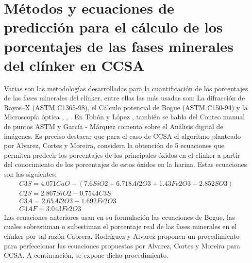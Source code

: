 \documentclass[spanish]{report}
\begin{document}
\section{Métodos y ecuaciones de predicción para el cálculo de los porcentajes de las fases minerales del clínker en CCSA}
Varias son las metodologías desarrolladas para la cuantificación de los porcentajes de las fases minerales del clínker, entre ellas las más usadas son: La difracción de Rayos–X (ASTM C1365-98), el Cálculo potencial de Bogue (ASTM C150-94) y la Microscopía óptica \cite{holderbank1975}, \cite{calderon77}, \cite{camara1988analise}. En Tobón y López \cite{tobon2007replanteamiento}, también se habla del Conteo manual de puntos ASTM y García - Márquez \cite{garcia2003automatic} comenta sobre el Análisis digital de imágenes. Es preciso destacar que para el caso de CCSA el algoritmo planteado por Alvarez, Cortes y Moreira, considera la obtención de 5 ecuaciones que permiten predecir los porcentajes de los principales óxidos en el clínker a partir del conocimiento de los porcentajes de estos óxidos en la harina. Estas ecuaciones son las siguientes:
\begin{align}
C3S = 4.071CaO−(7.6SiO2+6.718Al2O3+1.43Fe2O3+2.852SO3) \\  
C2S = 2.867SiO2 − 0.7544C3S  \\                            C3A = 2.65Al2O3 − 1.692Fe2O3   \\                          C4AF = 3.043Fe2O3
\end{align}
Las ecuaciones anteriores usan en su formulación las ecuaciones de Bogue, las cuales sobrestiman o subestiman el porcentaje real de las fases minerales en el clínker por tal razón Cabrera, Rodríguez y Alvarez \cite{alvarez2021perfeccionamiento} proponen un procedimiento para perfeccionar las ecuaciones propuestas por Alvarez, Cortes y Moreira para CCSA. A continuación, se expone dicho procedimiento.
\end{document}
